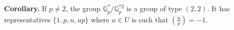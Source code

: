 \textbf{Corollary.} If $p \neq 2$, the group $\mathbb{Q}_p^*/\mathbb{Q}_p^{*2}$ is a group of type $(2,2)$. It has representatives $\{1, p, u, up\}$ where $u \in U$ is such that $\left(\frac{u}{p}\right) = -1$.
